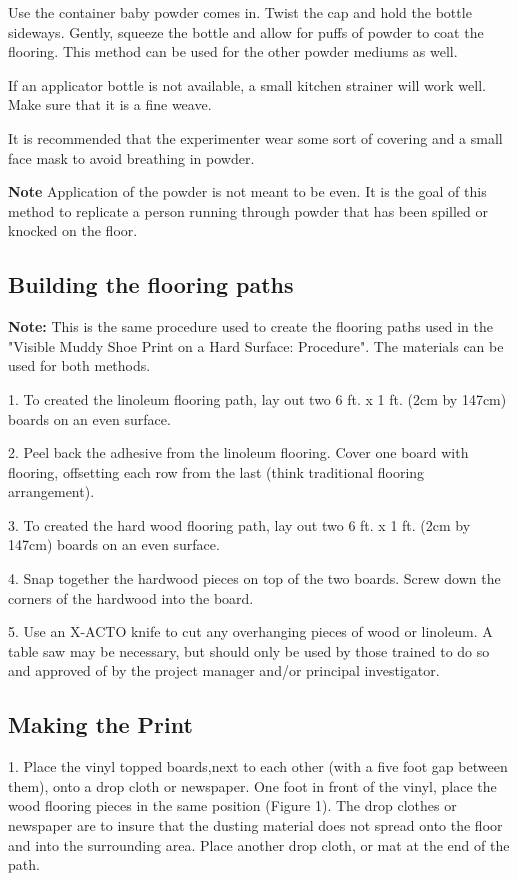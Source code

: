 Use the container baby powder comes in. Twist the cap and hold the bottle sideways. Gently, squeeze the bottle and allow for puffs of powder to coat the flooring. This method can be used for the other powder mediums as well.

If an applicator bottle is not available, a small kitchen strainer will work well. Make sure that it is a fine weave.

It is recommended that the experimenter wear some sort of covering and a small face mask to avoid breathing in powder.

\textbf{Note} Application of the powder is not meant to be even. It is the goal of this method to replicate a person running through powder that has been spilled or knocked on the floor.



\subsection{Building the flooring paths}
\textbf{Note:} This is the same procedure used to create the flooring paths used in the "Visible Muddy Shoe Print on a Hard Surface: Procedure". The materials can be used for both methods.

1. To created the linoleum flooring path, lay out two 6 ft. x 1 ft. (2cm by 147cm) boards on an even surface.

2. Peel back the adhesive from the linoleum flooring. Cover one board with flooring, offsetting each row from the last (think traditional flooring arrangement).

3. To created the hard wood flooring path, lay out two 6 ft. x 1 ft. (2cm by 147cm) boards on an even surface.

4. Snap together the hardwood pieces on top of the two boards. Screw down the corners of the hardwood into the board.

5. Use an X-ACTO knife to cut any overhanging pieces of wood or linoleum. A table saw may be necessary, but should only be used by those trained to do so and approved of by the project manager and/or principal investigator.

\subsection{Making the Print}

1.  Place the vinyl topped boards,next to each other (with a five foot gap between them), onto a drop cloth or newspaper. One foot in front of the vinyl, place the wood flooring pieces in the same position (Figure 1). The drop clothes or newspaper are to insure that the dusting material does not spread onto the floor and into the surrounding area. Place another drop cloth, or mat at the end of the path.

